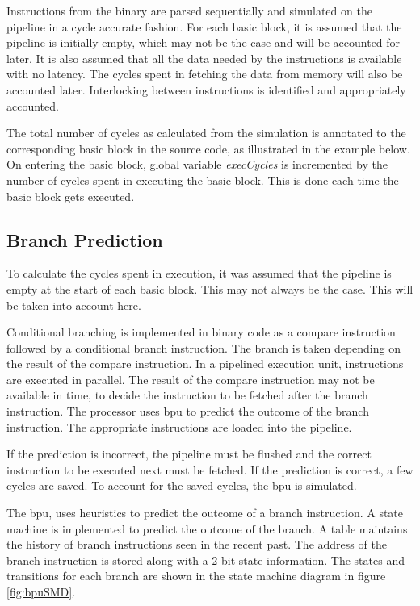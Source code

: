 Instructions from the binary are parsed sequentially and simulated on the pipeline in a cycle accurate fashion. For each basic block, it is assumed that the pipeline is initially empty, which may not be the case and will be accounted for later. It is also assumed that all the data needed by the instructions is available with no latency. The cycles spent in fetching the data from memory will also be accounted later. Interlocking between instructions is identified and appropriately accounted. 

The total number of cycles as calculated from the simulation is annotated to the corresponding basic block in the source code, as illustrated in the example below. On entering the basic block, global variable \emph{execCycles} is incremented by the number of cycles spent in executing the basic block. This is done each time the basic block gets executed.


\subsection{Branch Prediction}
To calculate the cycles spent in execution, it was assumed that the pipeline is empty at the start of each basic block. This may not always be the case. This will be taken into account here.

Conditional branching is implemented in binary code as a compare instruction followed by a conditional branch instruction. The branch is taken depending on the result of the compare instruction. In a pipelined execution unit, instructions are executed in parallel. The result of the compare instruction may not be available in time, to decide the instruction to be fetched after the branch instruction. The processor uses \gls{bpu} to predict the outcome of the branch instruction. The appropriate instructions are loaded into the pipeline.

If the prediction is incorrect, the pipeline must be flushed and the correct instruction to be executed next must be fetched. If the prediction is correct, a few cycles are saved. To account for the saved cycles, the \gls{bpu} is simulated.

The \gls{bpu}, uses heuristics to predict the outcome of a branch instruction. A state machine is implemented to predict the outcome of the branch. A table maintains the history of branch instructions seen in the recent past. The address of the branch instruction is stored along with a 2-bit state information. The states and transitions for each branch are shown in the state machine diagram in figure 
\ref{fig:bpuSMD}.

